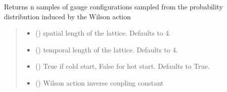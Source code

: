 \documentclass[letterpaper,10pt,english]{sphinxmanual}
\begin{document}
\begin{fulllineitems}
\label{\detokenize{ECMC:ECMC.ECMC_samples}}
\pysigstartsignatures
\pysiglinewithargsret
{}
{\sphinxparamcomma {}\sphinxparamcomma {}\sphinxparamcomma {}\sphinxparamcomma {}\sphinxparamcomma {}\sphinxparamcomma {}\sphinxparamcomma {}}
{}
\pysigstopsignatures
\sphinxAtStartPar
Returns n samples of gauge configurations sampled from the probability distribution induced by the Wilson action
\begin{quote}\begin{description}
\begin{itemize}
\item {} 
\sphinxAtStartPar
{} (\sphinxstyleliteralemphasis{\sphinxupquote{, }}) \textendash{} spatial length of the lattice. Defaults to 4.

\item {} 
\sphinxAtStartPar
{} (\sphinxstyleliteralemphasis{\sphinxupquote{, }}) \textendash{} temporal length of the lattice. Defaults to 4.

\item {} 
\sphinxAtStartPar
{} (\sphinxstyleliteralemphasis{\sphinxupquote{, }}) \textendash{} True if cold start, False for hot start. Defaults to True.

\item {} 
\sphinxAtStartPar
{} () \textendash{} Wilson action inverse coupling constant


\end{itemize}
\end{description}
\end{quote}
\end{fulllineitems}
\end{document}
